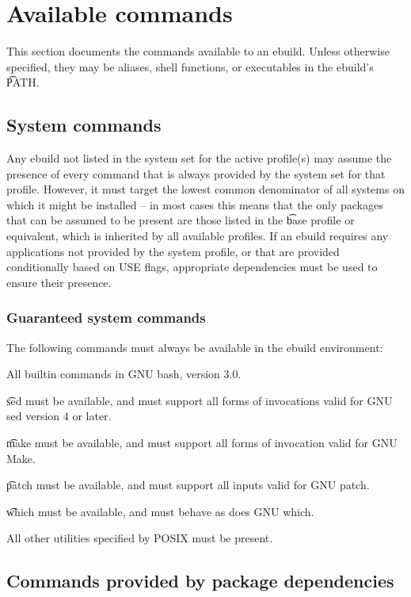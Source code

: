 \section{Available commands}
\label{ebuild-env-commands}

This section documents the commands available to an ebuild. Unless otherwise specified, they may be
aliases, shell functions, or executables in the ebuild's \t{PATH}.

\subsection{System commands}

Any ebuild not listed in the system set for the active profile(s) may assume the presence of every
command that is always provided by the system set for that profile. However, it must target the
lowest common denominator of all systems on which it might be installed -- in most cases this means
that the only packages that can be assumed to be present are those listed in the \t{base} profile or
equivalent, which is inherited by all available profiles. If an ebuild requires any applications not
provided by the system profile, or that are provided conditionally based on USE flags, appropriate
dependencies must be used to ensure their presence.

\subsubsection{Guaranteed system commands}

The following commands must always be available in the ebuild environment:
\item All builtin commands in GNU bash, version 3.0.
\item \t{sed} must be available, and must support all forms of invocations valid for GNU sed
    version 4 or later.
\item \t{make} must be available, and must support all forms of invocation valid for GNU Make.
\item \t{patch} must be available, and must support all inputs valid for GNU patch.
\item \t{which} must be available, and must behave as does GNU which.
\item All other utilities specified by POSIX must be present.

\subsection{Commands provided by package dependencies}

